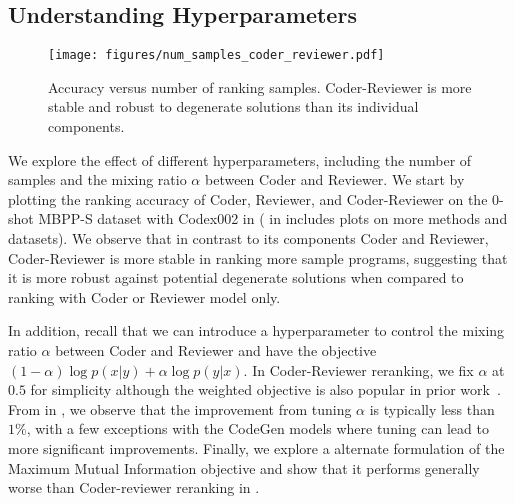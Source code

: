\documentclass[nohyperref]{article}
\theoremstyle{plain}
\theoremstyle{definition}
\theoremstyle{remark}
\begin{document}
\subsection{Understanding Hyperparameters}

\begin{figure}[t]
     \centering
     \texttt{[image: figures/num\_samples\_coder\_reviewer.pdf]}
     \caption{Accuracy versus number of ranking samples. Coder-Reviewer is more stable and robust to degenerate solutions than its individual components.}
     \vspace{-5pt}
     \label{fig:num_examples_final}
     \vspace{-10pt}
\end{figure}

\label{sec:hyperparameters}
We explore the effect of different hyperparameters, including the number of samples and the mixing ratio $\alpha$ between Coder and Reviewer.
We start by plotting the ranking accuracy of Coder, Reviewer, and Coder-Reviewer on the 0-shot MBPP-S dataset with Codex002 in  ( in  includes plots on more methods and datasets).
We observe that in contrast to its components Coder and Reviewer, Coder-Reviewer is more stable in ranking more sample programs, suggesting that it is more robust against potential degenerate solutions when compared to ranking with Coder or Reviewer model only. 


In addition, recall that we can introduce a hyperparameter  to control the mixing ratio $\alpha$ between Coder and Reviewer and have the objective $(1-\alpha)\log p(x|y) + \alpha\log p(y|x)$.
In Coder-Reviewer reranking,  we fix $\alpha$ at $0.5$ for simplicity although the weighted objective is also popular in prior work~\citep{mmi-diversity}.
From  in , we observe that the improvement from tuning $\alpha$ is typically less than $1\%$, with a few exceptions with the CodeGen models where tuning can lead to more significant improvements.
Finally, we explore a alternate formulation of the Maximum Mutual Information objective and show that it performs generally worse than Coder-reviewer reranking in .
\end{document}
